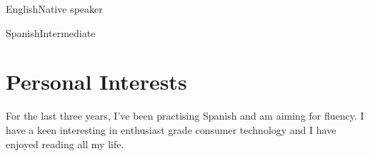 \documentclass{tccv}
\begin{document}
\begin{factlist}
\item{English}{Native speaker}
\item{Spanish}{Intermediate}
\end{factlist}



    
     
	 
	
\section{Personal Interests}

For the last three years, I've been practising Spanish and am aiming for fluency. I have a keen interesting in enthusiast grade consumer technology and I have enjoyed reading all my life.
\end{document}
